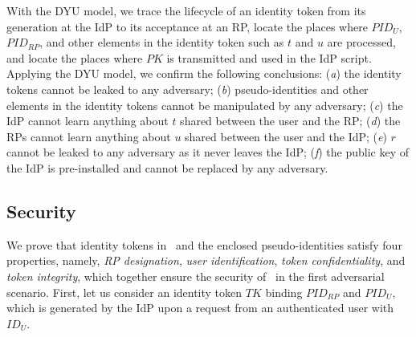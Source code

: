 With the DYU model, we trace the lifecycle of an identity token from its generation at the IdP to its acceptance at an RP, locate the places where $PID_U$, $PID_{RP}$, and other elements in the identity token such as $t$ and $u$ are processed, and locate the places where $PK$ is transmitted and used in the IdP script. Applying the DYU model, we confirm the following conclusions: (\emph{a}) the identity tokens cannot be leaked to any adversary; (\emph{b}) pseudo-identities and other elements in the identity tokens cannot be manipulated by any adversary; (\emph{c}) the IdP cannot learn anything about $t$ shared between the user and the RP; (\emph{d}) the RPs cannot learn anything about $u$ shared between the user and the IdP; (\emph{e}) $r$ cannot be leaked to any adversary as it never leaves the IdP; (\emph{f}) the public key of the IdP is pre-installed and cannot be replaced by any adversary.



\subsection{Security}
\label{analysis-security}


We prove that identity tokens in \usso~and the enclosed pseudo-identities satisfy four properties, namely, \emph{RP designation}, \emph{user identification}, \emph{token confidentiality}, and \emph{token integrity}, which together ensure the security of \usso~in the first adversarial scenario.
First, let us consider an identity token $TK$ binding $PID_{RP}$ and $PID_U$, which is generated by the IdP upon a request from an authenticated user with $ID_U$.


